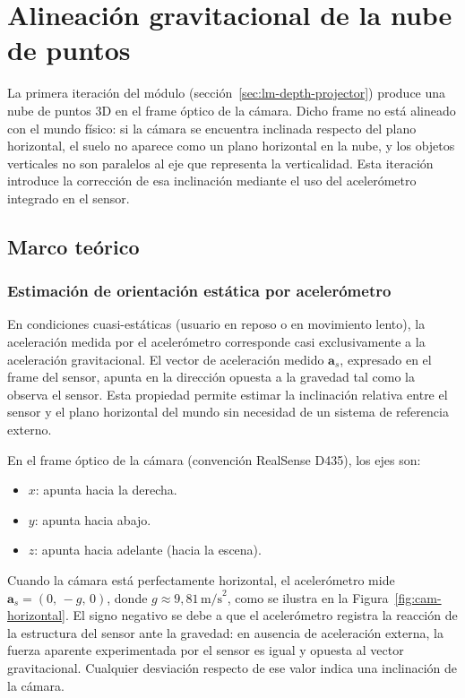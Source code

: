 %

\section{Alineación gravitacional de la nube de puntos}
\label{sec:lm-gravity-aligner}

La primera iteración del módulo (sección~\ref{sec:lm-depth-projector})
produce una nube de puntos 3D en el frame óptico de la cámara. Dicho frame
no está alineado con el mundo físico: si la cámara se encuentra inclinada
respecto del plano horizontal, el suelo no aparece como un plano horizontal
en la nube, y los objetos verticales no son paralelos al eje que representa
la verticalidad. Esta iteración introduce la corrección de esa inclinación
mediante el uso del acelerómetro integrado en el sensor.

\subsection{Marco teórico}

\subsubsection{Estimación de orientación estática por acelerómetro}

En condiciones cuasi-estáticas (usuario en reposo o en movimiento lento), la
aceleración medida por el acelerómetro corresponde casi exclusivamente a la
aceleración gravitacional. El vector de aceleración medido $\mathbf{a}_s$,
expresado en el frame del sensor, apunta en la dirección opuesta a la
gravedad tal como la observa el sensor. Esta propiedad permite estimar la
inclinación relativa entre el sensor y el plano horizontal del mundo sin
necesidad de un sistema de referencia externo.

En el frame óptico de la cámara (convención RealSense D435), los ejes son:
\begin{itemize}
  \item $x$: apunta hacia la derecha.
  \item $y$: apunta hacia abajo.
  \item $z$: apunta hacia adelante (hacia la escena).
\end{itemize}
Cuando la cámara está perfectamente horizontal, el acelerómetro mide
$\mathbf{a}_s = (0,\, -g,\, 0)$, donde $g \approx 9{,}81\,\text{m/s}^2$,
como se ilustra en la Figura~\ref{fig:cam-horizontal}.
El signo negativo se debe a que el acelerómetro registra la reacción de la
estructura del sensor ante la gravedad: en ausencia de aceleración externa,
la fuerza aparente experimentada por el sensor es igual y opuesta al vector
gravitacional. Cualquier desviación respecto de ese valor indica una
inclinación de la cámara.

